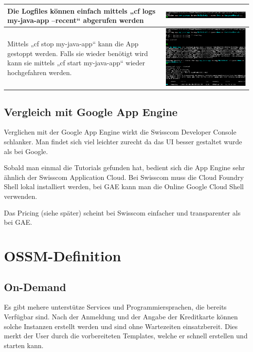 \begin{longtable}{| p{5cm} | p{11cm} |}
Die Logfiles können einfach mittels „cf logs my-java-app --recent“ abgerufen werden &\includegraphics[width=0.65\columnwidth, valign=T]{images/image19.png} \\ \hline
Mittels „cf stop my-java-app“ kann die App gestoppt werden. Falls sie wieder benötigt wird kann sie mittels „cf start my-java-app“ wieder hochgefahren werden. 
&\includegraphics[width=0.65\columnwidth, valign=T]{images/image20.png} \\ \hline
\end{longtable}
\section{Vergleich mit Google App Engine}
Verglichen mit der Google App Engine wirkt die Swisscom Developer Console schlanker. Man findet sich viel leichter zurecht da das UI besser gestaltet wurde als bei Google. 

Sobald man einmal die Tutorials gefunden hat, bedient sich die App Engine sehr ähnlich der Swisscom Application Cloud. Bei Swisscom muss die Cloud Foundry Shell lokal installiert werden, bei GAE kann man die Online Google Cloud Shell verwenden. 

Das Pricing (siehe später) scheint bei Swisscom einfacher und transparenter als bei GAE. 
\chapter{OSSM-Definition}
\section{On-Demand}
Es gibt mehere unterstütze Services und Programmiersprachen, die bereits Verfügbar sind. Nach der Anmeldung und der Angabe der Kreditkarte können solche Instanzen erstellt werden und sind ohne Wartezeiten einsatzbereit. Dies merkt der User durch die vorbereiteten Templates, welche er schnell erstellen und starten kann.
